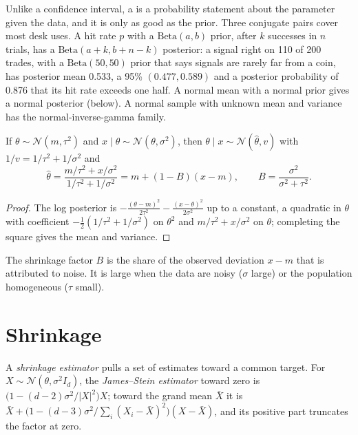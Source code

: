 Unlike a confidence interval, a  is a probability statement about the parameter given the data, and it is only as good as
the prior. Three conjugate pairs cover most desk uses. A hit rate $p$ with a $\mathrm{Beta}(a, b)$ prior, after $k$ successes in $n$ trials,
has a $\mathrm{Beta}(a + k, b + n - k)$ posterior: a signal right on 110 of 200 trades, with a $\mathrm{Beta}(50, 50)$ prior that says
signals are rarely far from a coin, has posterior mean 0.533, a 95\%  $(0.477, 0.589)$ and a posterior probability of
0.876 that its hit rate exceeds one half. A normal mean with a normal prior gives a normal posterior (below). A normal sample with
unknown mean and variance has the normal-inverse-gamma family.

\begin{proposition}\label{prop:qm:bayesian-methods:normal}
If $\theta \sim \mathcal N(m, \tau^2)$ and $x \mid \theta \sim \mathcal N(\theta, \sigma^2)$, then $\theta \mid x \sim \mathcal N(\hat\theta,
v)$ with $1/v = 1/\tau^2 + 1/\sigma^2$ and
\[
\hat\theta = \frac{m/\tau^2 + x/\sigma^2}{1/\tau^2 + 1/\sigma^2} = m + (1 - B)(x - m), \qquad B = \frac{\sigma^2}{\sigma^2 + \tau^2}.
\]
\end{proposition}

\begin{proof}
The log posterior is $-\frac{(\theta - m)^2}{2\tau^2} - \frac{(x - \theta)^2}{2\sigma^2}$ up to a constant, a quadratic in $\theta$ with
coefficient $-\frac12(1/\tau^2 + 1/\sigma^2)$ on $\theta^2$ and $m/\tau^2 + x/\sigma^2$ on $\theta$; completing the square gives the mean
and variance.
\end{proof}

The shrinkage factor $B$ is the share of the observed deviation $x - m$ that is attributed to noise. It is large when the data are noisy
($\sigma$ large) or the population homogeneous ($\tau$ small).

\section{Shrinkage}

\begin{definition}\label{def:qm:bayesian-methods:js}
A \emph{shrinkage estimator} pulls a set of estimates toward a common target. For $X \sim \mathcal N(\theta,
\sigma^2I_d)$, the \emph{James--Stein estimator} toward zero is $\bigl(1 - (d - 2)\sigma^2/\lvert X\rvert^2\bigr)X$;
toward the grand mean $\bar X$ it is $\bar X + \bigl(1 - (d - 3)\sigma^2/\sum_i(X_i - \bar X)^2\bigr)(X - \bar X)$, and its positive part
truncates the factor at zero.
\end{definition}

